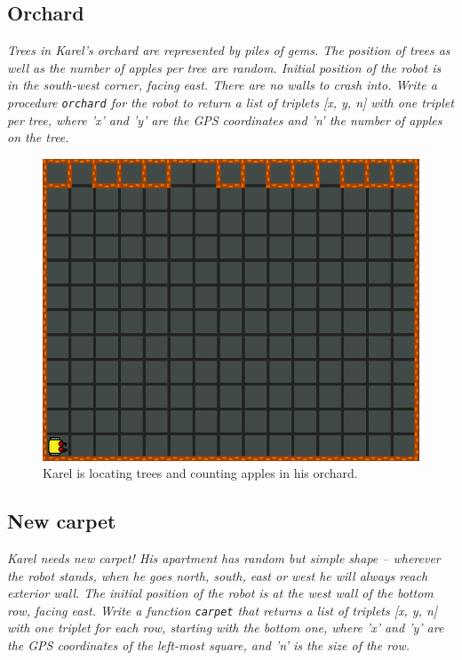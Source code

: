 \newpage

\subsection{Orchard}

{\em Trees in Karel's orchard are represented by piles of gems. The position of trees as well as the number of apples per tree are random. Initial position of the robot is in the south-west corner, facing east. There are no walls to crash into. Write a procedure {\tt orchard} for the robot to return a list of triplets [x, y, n] with one triplet per tree, where 'x' and 'y' are the GPS coordinates and 'n' the number of apples on the tree.}


\begin{figure}[!ht]
\begin{center}
\includegraphics[height=0.4\textwidth]{img/h03.png}
\end{center}
\vspace{-4mm}
\caption{Karel is locating trees and counting apples in his orchard.}
\label{fig:h03}
\end{figure}

\newpage

\subsection{New carpet}

{\em Karel needs new carpet! His apartment has random but simple shape -- wherever 
the robot stands, when he goes north, south, east or west he will always reach exterior wall.
The initial position of the robot is at the west wall of the bottom row, facing east. 
Write a function {\tt carpet} that returns a list of triplets [x, y, n] with one triplet for each
row, starting with the bottom one, where 'x' and 'y' are the GPS coordinates of the left-most
square, and 'n' is the size of the row. }

